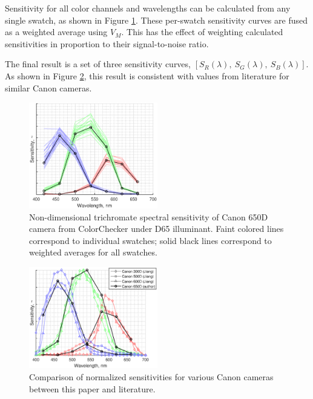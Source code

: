 \documentclass[twocolumn,10pt]{asme2ej}
\newcommand{\id}{\hspace{6 mm}}
\begin{document}
\id Sensitivity for all color channels and wavelengths can be calculated from any single swatch, as shown in Figure \ref{canon_650d_sensitivity}. These per-swatch sensitivity curves are fused as a weighted average using $V_M$. This has the effect of weighting calculated sensitivities in proportion to their signal-to-noise ratio.

\id The final result is a set of three sensitivity curves, $\left[ S_R(\lambda), \ S_G(\lambda), \ S_B(\lambda) \right]$. As shown in Figure \ref{camera_spectral_sensitivities}, this result is consistent with values from literature for similar Canon cameras.

\begin{figure}
\centering
\includegraphics[width=0.5\textwidth]{canon_650d_sensitivity.eps}
\caption{Non-dimensional trichromate spectral sensitivity of Canon 650D camera from ColorChecker under D65 illuminant. Faint colored lines correspond to individual swatches; solid black lines correspond to weighted averages for all swatches.}
\label{canon_650d_sensitivity}
\end{figure}

\begin{figure}
\centering
\includegraphics[width=0.5\textwidth]{camera_spectral_sensitivities.eps}
\caption{Comparison of normalized sensitivities for various Canon cameras between this paper and literature. \cite{Jiang}}
\label{camera_spectral_sensitivities}
\end{figure}
\end{document}
